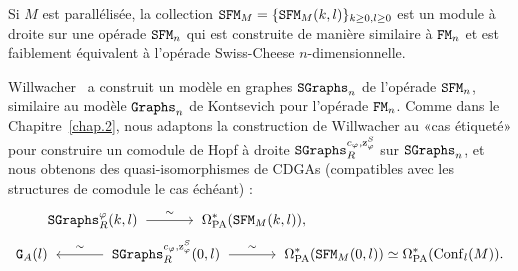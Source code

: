 Si $M$ est parallélisée, la collection $\mathtt{SFM}_{M} = \{ \mathtt{SFM}_{M}(k,l) \}_{k \geq 0, l \geq 0}$ est un module à droite sur une opérade $\mathtt{SFM}_{n}$ qui est construite de manière similaire à $\mathtt{FM}_{n}$ et est faiblement équivalent à l'opérade Swiss-Cheese $n$-dimensionnelle.

Willwacher~\cite{Willwacher2015a} a construit un modèle en graphes $\mathtt{SGraphs}_{n}$ de l'opérade $\mathtt{SFM}_{n}$, similaire au modèle $\mathtt{Graphs}_{n}$ de Kontsevich pour l'opérade $\mathtt{FM}_{n}$.
Comme dans le Chapitre~\ref{chap.2}, nous adaptons la construction de Willwacher au «cas étiqueté» pour construire un comodule de Hopf à droite $\mathtt{SGraphs}^{c_{\varphi},\mathrm{z}^{S}_{\varphi}}_{R}$ sur $\mathtt{SGraphs}_{n}$, et nous obtenons des quasi-isomorphismes de CDGAs (compatibles avec les structures de comodule le cas échéant) :
\begin{align*}
  {} & \SGraphs^{\varphi}_{R}(k,l) \qiso \OmPA^{*}(\SFM_{M}(k,l)), \\
  \GG{A}(l) & \qiso* \SGraphs^{c_{\varphi},\szphi}_{R}(0,l) \qiso \OmPA^{*}(\SFM_{M}(0,l)) \simeq \OmPA^{*}(\Conf_{l}(M)).
\end{align*}
